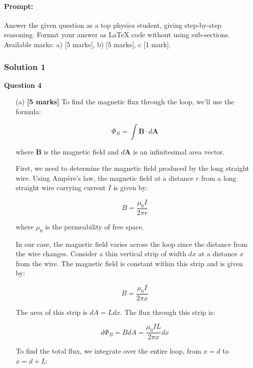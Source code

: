 \documentclass{article}
\begin{document}
\paragraph{Prompt: \\} 
Answer the given question as a top physics student, giving step-by-step reasoning. Format your answer as LaTeX code without using sub-sections. Available marks: a) [5 marks], b) [5 marks], c [1 mark].

\subsubsection{Solution 1}
\textbf{Question 4}

\begin{enumerate}
\item[(a)] \textbf{[5 marks]} 
To find the magnetic flux through the loop, we'll use the formula:

\begin{equation*}
\Phi_B = \int \mathbf{B} \cdot d\mathbf{A}
\end{equation*}

where $\mathbf{B}$ is the magnetic field and $d\mathbf{A}$ is an infinitesimal area vector.

First, we need to determine the magnetic field produced by the long straight wire. Using Ampère's law, the magnetic field at a distance $r$ from a long straight wire carrying current $I$ is given by:

\begin{equation*}
B = \frac{\mu_0 I}{2 \pi r}
\end{equation*}

where $\mu_0$ is the permeability of free space.

In our case, the magnetic field varies across the loop since the distance from the wire changes. Consider a thin vertical strip of width $dx$ at a distance $x$ from the wire. The magnetic field is constant within this strip and is given by:

\begin{equation*}
B = \frac{\mu_0 I}{2 \pi x}
\end{equation*}

The area of this strip is $dA = L dx$. The flux through this strip is:

\begin{equation*}
d\Phi_B = B dA = \frac{\mu_0 I L}{2 \pi x} dx
\end{equation*}

To find the total flux, we integrate over the entire loop, from $x = d$ to $x = d + L$:


\end{enumerate}
\end{document}
